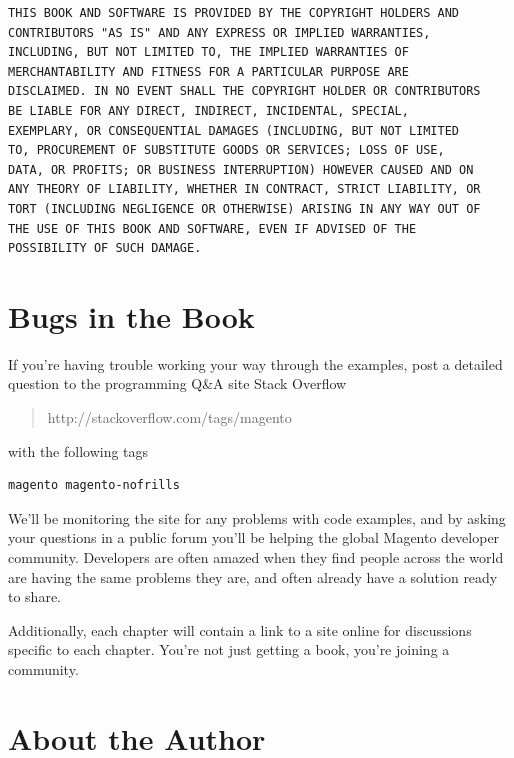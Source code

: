 \documentclass[oneside]{book}
\begin{document}
\begin{lstlisting}
THIS BOOK AND SOFTWARE IS PROVIDED BY THE COPYRIGHT HOLDERS AND
CONTRIBUTORS "AS IS" AND ANY EXPRESS OR IMPLIED WARRANTIES,
INCLUDING, BUT NOT LIMITED TO, THE IMPLIED WARRANTIES OF
MERCHANTABILITY AND FITNESS FOR A PARTICULAR PURPOSE ARE
DISCLAIMED. IN NO EVENT SHALL THE COPYRIGHT HOLDER OR CONTRIBUTORS
BE LIABLE FOR ANY DIRECT, INDIRECT, INCIDENTAL, SPECIAL,
EXEMPLARY, OR CONSEQUENTIAL DAMAGES (INCLUDING, BUT NOT LIMITED
TO, PROCUREMENT OF SUBSTITUTE GOODS OR SERVICES; LOSS OF USE,
DATA, OR PROFITS; OR BUSINESS INTERRUPTION) HOWEVER CAUSED AND ON
ANY THEORY OF LIABILITY, WHETHER IN CONTRACT, STRICT LIABILITY, OR
TORT (INCLUDING NEGLIGENCE OR OTHERWISE) ARISING IN ANY WAY OUT OF
THE USE OF THIS BOOK AND SOFTWARE, EVEN IF ADVISED OF THE
POSSIBILITY OF SUCH DAMAGE.

\end{lstlisting}


\section{Bugs in the Book}

If you're having trouble working your way through the examples, post a detailed question to the programming Q\&A site Stack Overflow

\begin{quote}
http://stackoverflow.com/tags/magento
\end{quote}

with the following tags

\begin{lstlisting}
magento magento-nofrills

\end{lstlisting}


We'll be monitoring the site for any problems with code examples, and by asking your questions in a public forum you'll be helping the global Magento developer community.  Developers are often amazed when they find people across the world are having the same problems they are, and often already have a solution ready to share.

Additionally, each chapter will contain a link to a site online for discussions specific to each chapter.  You're not just getting a book, you're joining a community.

\section{About the Author}
\end{document}
